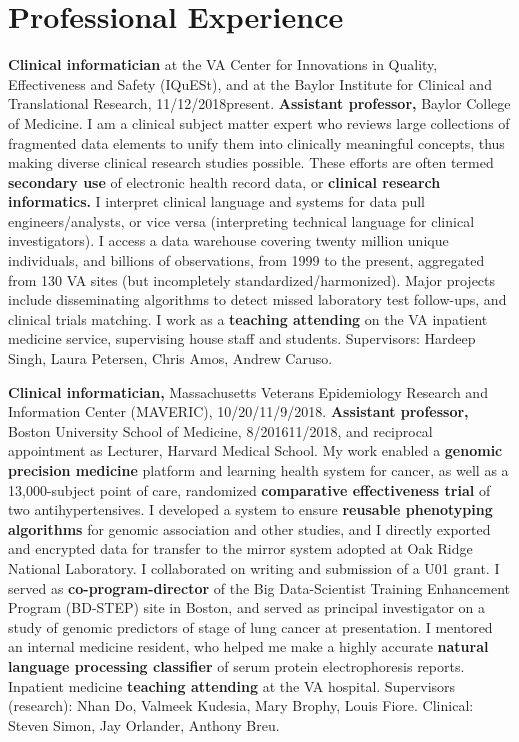 \documentclass[10pt]{article}
\begin{document}
\section*{Professional Experience} %

\textbf{Clinical informatician} at the VA Center for Innovations in
Quality, Effectiveness and Safety (IQuESt), and at the Baylor
Institute for Clinical and Translational Research,
11/12/2018\ndash{}present. \textbf{Assistant professor,} Baylor
College of Medicine. I am a clinical subject matter expert who reviews
large collections of fragmented data elements to unify them into
clinically meaningful concepts, thus making diverse clinical research
studies possible.  These efforts are often termed \textbf{secondary
  use} of electronic health record data, or \textbf{clinical research
  informatics.} I interpret clinical language and systems for data
pull engineers/analysts, or vice versa (interpreting technical
language for clinical investigators). I access a data warehouse
covering twenty million unique individuals, and billions of
observations, from 1999 to the present, aggregated from 130 VA sites
(but incompletely standardized/harmonized). Major projects include
disseminating algorithms to detect missed laboratory test follow-ups,
and clinical trials matching. I work as a \textbf{teaching
  attending} on the VA inpatient medicine service, supervising house
staff and students. Supervisors: Hardeep Singh, Laura
Petersen, Chris Amos, Andrew Caruso.

\textbf{Clinical informatician,} Massachusetts Veterans Epidemiology
Research and Information Center (MAVERIC),
10/20/\ndash{}11/9/2018. \textbf{Assistant
  professor,} Boston University School of Medicine,
8/2016\ndash{}11/2018, and reciprocal appointment as Lecturer, Harvard
Medical School. My work enabled a \textbf{genomic precision medicine}
platform and learning health system for cancer, as well as
a 13,000-subject point of care, randomized \textbf{comparative
  effectiveness trial} of two antihypertensives. I developed a system
to ensure \textbf{reusable phenotyping algorithms} for genomic
association and other studies, and I directly exported and encrypted
data for transfer to the mirror system adopted at Oak Ridge National
Laboratory. I collaborated on writing and submission of a
U01 grant. I served as \textbf{co-program-director} of the Big
Data-Scientist Training Enhancement Program (BD-STEP) site in Boston,
and served as principal investigator on a study of genomic predictors
of stage of lung cancer at presentation. I mentored an internal
medicine resident, who helped me make a highly accurate
\textbf{natural language processing classifier} of serum protein
electrophoresis reports. Inpatient medicine \textbf{teaching
  attending} at the VA hospital. Supervisors (research): Nhan Do,
Valmeek Kudesia, Mary Brophy, Louis Fiore. Clinical: Steven Simon, Jay
Orlander, Anthony Breu.
\end{document}
